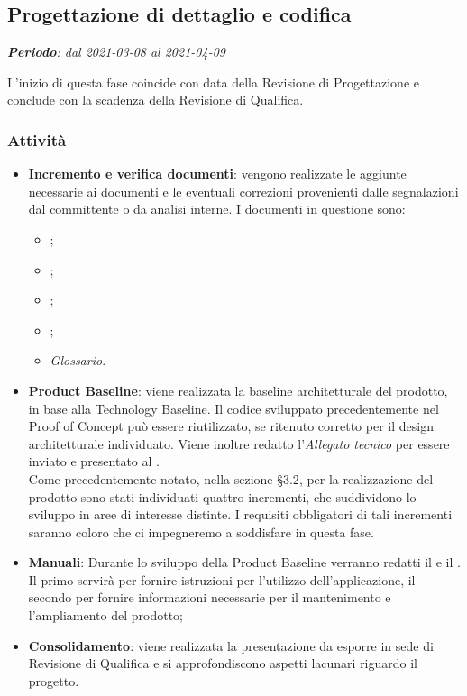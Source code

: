 \subsection{Progettazione di dettaglio e codifica}
\textit{\textbf{Periodo}: dal 2021-03-08 al 2021-04-09}

L'inizio di questa fase coincide con data della Revisione di Progettazione e conclude con la scadenza della Revisione di Qualifica.

\subsubsection{Attività}

\begin{itemize}
\item \textbf{Incremento e verifica documenti}: vengono realizzate le aggiunte necessarie ai documenti e le eventuali correzioni provenienti dalle segnalazioni dal committente o da analisi interne. I documenti in questione sono:
\begin{itemize}
\item \NdP{};
\item \AdR{};
\item \PdQ{};
\item \PdP{};
\item \textit{Glossario}.
\end{itemize}
\item \textbf{Product Baseline}: viene realizzata la baseline architetturale del prodotto, in base alla Technology Baseline. Il codice sviluppato precedentemente nel Proof of Concept può essere riutilizzato, se ritenuto corretto per il design architetturale individuato. Viene inoltre redatto l'\textit{Allegato tecnico} per essere inviato e presentato al \CR{}.\\ Come precedentemente notato, nella sezione \S{3.2}, per la realizzazione del prodotto sono stati individuati quattro incrementi, che suddividono lo sviluppo in aree di interesse distinte. I requisiti obbligatori di tali incrementi saranno coloro che ci impegneremo a soddisfare in questa fase.
\item \textbf{Manuali}: Durante lo sviluppo della Product Baseline verranno redatti il \MU e il \MM. Il primo servirà per fornire istruzioni per l'utilizzo dell'applicazione, il secondo per fornire informazioni necessarie per il mantenimento e l'ampliamento del prodotto;
\item \textbf{Consolidamento}: viene realizzata la presentazione da esporre in sede di Revisione di Qualifica e si approfondiscono aspetti lacunari riguardo il progetto.
\end{itemize}

